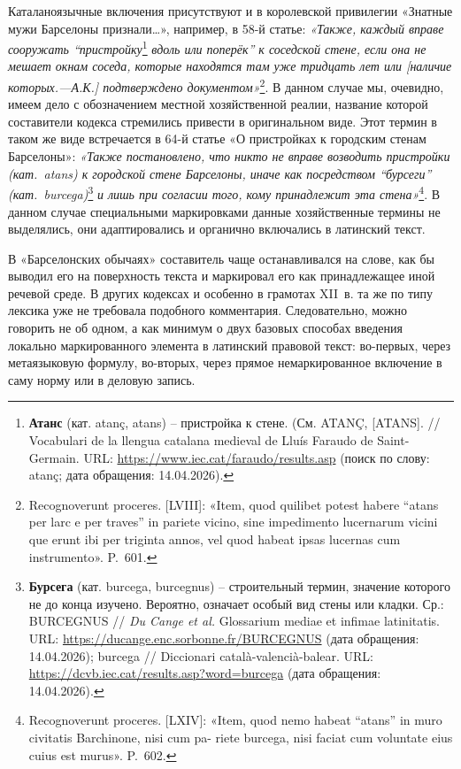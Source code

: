 Каталаноязычные включения присутствуют и в королевской привилегии «Знатные мужи Барселоны признали…», например, в 58-й статье: \emph{«Также, каждый вправе сооружать “пристройку}\footnote{\textbf{Атанс}\textbf{ }(кат. atanç, atans) -- пристройка к стене. (См. ATANÇ, [ATANS]. // Vocabulari de la llengua catalana medieval de Lluís Faraudo de Saint-Germain. URL: \url{https://www.iec.cat/faraudo/results.asp} (поиск по слову: atanç; дата обращения: 14.04.2026).}\emph{ вдоль или поперёк” к соседской стене, если она не мешает окнам соседа, которые находятся там уже тридцать лет или [наличие которых.---А.К.] подтверждено документом»}\footnote{Recognoverunt proceres. [LVIII]: «Item, quod quilibet potest habere “atans per larc e per traves” in pariete vicino, sine impedimento lucernarum vicini que erunt ibi per triginta annos, vel quod habeat ipsas lucernas cum instrumento». P.~601.}. В данном случае мы, очевидно, имеем дело с обозначением местной хозяйственной реалии, название которой составители кодекса стремились привести в оригинальном виде. Этот термин в таком же виде встречается в 64-й статье «О пристройках к городским стенам Барселоны»: \emph{«Также постановлено, что никто не вправе возводить пристройки (кат.}\emph{~}\emph{atans}\emph{) к городской стене Барселоны, иначе как посредством “бурсеги” (кат.}\emph{~}\emph{burcega}\emph{)}\footnote{\textbf{Бурсега} (кат. burcega, burcegnus) -- строительный термин, значение которого не до конца изучено. Вероятно, означает особый вид стены или кладки. Ср.: BURCEGNUS // \emph{Du Cange et al.} Glossarium mediae et infimae latinitatis. URL: \url{https://ducange.enc.sorbonne.fr/BURCEGNUS} (дата обращения: 14.04.2026); burcega // Diccionari català-valencià-balear. URL: \url{https://dcvb.iec.cat/results.asp?word=burcega} (дата обращения: 14.04.2026).}\emph{ и лишь при согласии того, кому принадлежит эта стена»}\footnote{Recognoverunt proceres. [LXIV]: «Item, quod nemo habeat “atans” in muro civitatis Barchinone, nisi cum pa- riete burcega, nisi faciat cum voluntate eius cuius est murus». P.~602.}. В данном случае специальными маркировками данные хозяйственные термины не выделялись, они адаптировались и органично включались в латинский текст.

В «Барселонских обычаях» составитель чаще останавливался на слове, как бы выводил его на поверхность текста и маркировал его как принадлежащее иной речевой среде. В других кодексах и особенно в грамотах XII~в. та же по типу лексика уже не требовала подобного комментария. Следовательно, можно говорить не об одном, а как минимум о двух базовых способах введения локально маркированного элемента в латинский правовой текст: во-первых, через метаязыковую формулу, во-вторых, через прямое немаркированное включение в саму норму или в деловую запись.

